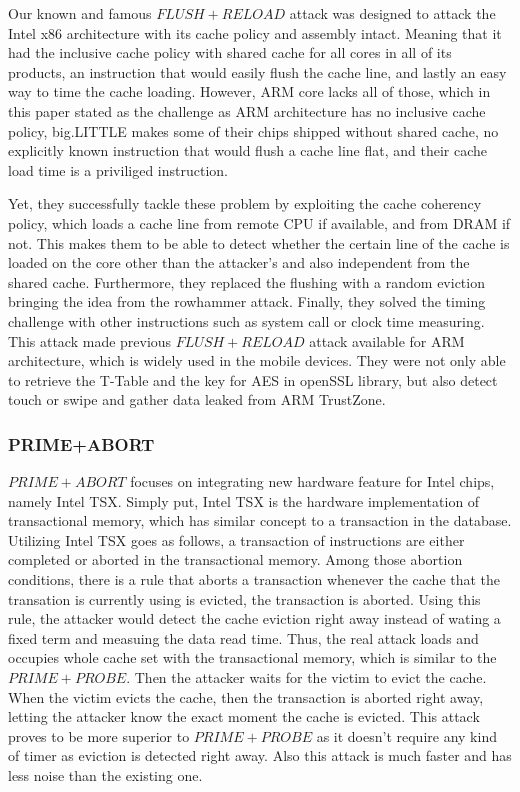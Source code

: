 \documentclass[a4paper]{article}
\begin{document}
Our known and famous $FLUSH+RELOAD$ attack was designed to attack the Intel x86 architecture with its cache policy and assembly intact. Meaning that it had the inclusive cache policy with shared cache for all cores in all of its products, an instruction that would easily flush the cache line, and lastly an easy way to time the cache loading. However, ARM core lacks all of those, which in this paper stated as the challenge as ARM architecture has no inclusive cache policy, big.LITTLE makes some of their chips shipped without shared cache, no explicitly known instruction that would flush a cache line flat, and their cache load time is a priviliged instruction.
\par Yet, they successfully tackle these problem by exploiting the cache coherency policy, which loads a cache line from remote CPU if available, and from DRAM if not. This makes them to be able to detect whether the certain line of the cache is loaded on the core other than the attacker's and also independent from the shared cache. Furthermore, they replaced the flushing with a random eviction bringing the idea from the rowhammer attack. Finally, they solved the timing challenge with other instructions such as system call or clock time measuring. This attack made previous $FLUSH+RELOAD$ attack available for ARM architecture, which is widely used in the mobile devices. They were not only able to retrieve the T-Table and the key for AES in openSSL library, but also detect touch or swipe and gather data leaked from ARM TrustZone.

\subsubsection*{PRIME+ABORT}

$PRIME+ABORT$ focuses on integrating new hardware feature for Intel chips, namely Intel TSX. Simply put, Intel TSX is the hardware implementation of transactional memory, which has similar concept to a transaction in the database. Utilizing Intel TSX goes as follows, a transaction of instructions are either completed or aborted in the transactional memory. Among those abortion conditions, there is a rule that aborts a transaction whenever the cache that the transation is currently using is evicted, the transaction is aborted. Using this rule, the attacker would detect the cache eviction right away instead of wating a fixed term and measuing the data read time. Thus, the real attack loads and occupies whole cache set with the transactional memory, which is similar to the $PRIME+PROBE$. Then the attacker waits for the victim to evict the cache. When the victim evicts the cache, then the transaction is aborted right away, letting the attacker know the exact moment the cache is evicted. This attack proves to be more superior to $PRIME+PROBE$ as it doesn't require any kind of timer as eviction is detected right away. Also this attack is much faster and has less noise than the existing one.
\end{document}
